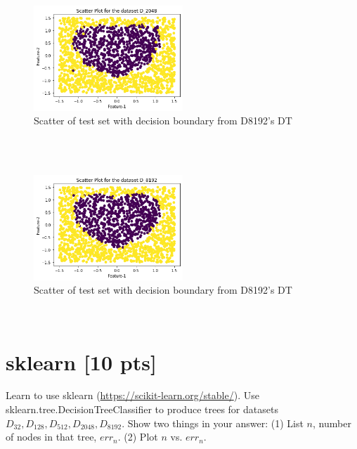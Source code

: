 \documentclass[a4paper]{article}
\theoremstyle{definition}
\newenvironment{soln}{
    \leavevmode\color{blue}\ignorespaces
}{}
\begin{document}
\begin{enumerate}
\begin{soln}
    \begin{figure}[h!]
        \centering
        \includegraphics[width=0.5\textwidth]{images/q2_7_3d.png}
        \caption{Scatter of test set with decision boundary from D8192's DT}
        \label{fig:q2_7_3d}
    \end{figure} \\\

    \begin{figure}[h!]
        \centering
        \includegraphics[width=0.5\textwidth]{images/q2_7_3e.png}
        \caption{Scatter of test set with decision boundary from D8192's DT}
        \label{fig:q2_7_3e}
    \end{figure} \\
  \end{soln}
\end{enumerate}

\section{sklearn [10 pts]}
Learn to use sklearn (\url{https://scikit-learn.org/stable/}).
Use sklearn.tree.DecisionTreeClassifier to produce trees for datasets $D_{32}, D_{128}, D_{512}, D_{2048}, D_{8192}$.  Show two things in your answer: (1) List $n$, number of nodes in that tree, $err_n$. (2) Plot $n$ vs. $err_n$.
\end{document}
